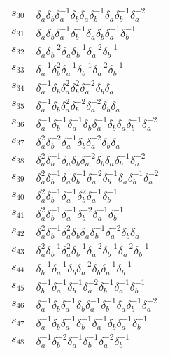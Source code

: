 \documentclass{article}
\begin{document}
\begin{center}
\begin{tabular}{ll}
$s_{30}$ & $\delta_a^{}\delta_b^{}\delta_a^{-1}\delta_b^{}\delta_a^{}\delta_b^{-1}\delta_a^{}\delta_b^{-1}\delta_a^{-2}$ \\
$s_{31}$ & $\delta_a^{}\delta_b^{}\delta_a^{-1}\delta_b^{-1}\delta_a^{}\delta_b^{}\delta_a^{-1}\delta_b^{-1}$ \\
$s_{32}$ & $\delta_a^{}\delta_b^{-2}\delta_a^{}\delta_b^{-1}\delta_a^{-2}\delta_b^{-1}$ \\
$s_{33}$ & $\delta_a^{-1}\delta_b^{2}\delta_a^{-1}\delta_b^{-1}\delta_a^{-2}\delta_b^{-1}$ \\
$s_{34}$ & $\delta_a^{-1}\delta_b^{}\delta_a^{2}\delta_b^{2}\delta_a^{-2}\delta_b^{}\delta_a^{}$ \\
$s_{35}$ & $\delta_a^{-1}\delta_b^{}\delta_a^{2}\delta_b^{-2}\delta_a^{-2}\delta_b^{}\delta_a^{}$ \\
$s_{36}$ & $\delta_a^{-1}\delta_b^{-1}\delta_a^{-1}\delta_b^{}\delta_a^{-1}\delta_b^{}\delta_a^{}\delta_b^{-1}\delta_a^{-2}$ \\
$s_{37}$ & $\delta_a^{2}\delta_b^{-2}\delta_a^{-1}\delta_b^{}\delta_a^{-2}\delta_b^{}\delta_a^{}$ \\
$s_{38}$ & $\delta_a^{2}\delta_b^{-1}\delta_a^{}\delta_b^{}\delta_a^{-2}\delta_b^{}\delta_a^{}\delta_b^{-1}\delta_a^{-2}$ \\
$s_{39}$ & $\delta_a^{2}\delta_b^{-1}\delta_a^{}\delta_b^{-1}\delta_a^{-2}\delta_b^{-1}\delta_a^{}\delta_b^{-1}\delta_a^{-2}$ \\
$s_{40}$ & $\delta_a^{2}\delta_b^{-1}\delta_a^{-1}\delta_b^{2}\delta_a^{-1}\delta_b^{-1}$ \\
$s_{41}$ & $\delta_a^{2}\delta_b^{-1}\delta_a^{-1}\delta_b^{-2}\delta_a^{-1}\delta_b^{-1}$ \\
$s_{42}$ & $\delta_a^{2}\delta_b^{-1}\delta_a^{2}\delta_b^{}\delta_a^{}\delta_b^{-1}\delta_a^{-2}\delta_b^{}\delta_a^{}$ \\
$s_{43}$ & $\delta_a^{2}\delta_b^{-1}\delta_a^{2}\delta_b^{-1}\delta_a^{-2}\delta_b^{-1}\delta_a^{-2}\delta_b^{-1}$ \\
$s_{44}$ & $\delta_b^{-1}\delta_a^{-1}\delta_b^{}\delta_a^{-2}\delta_b^{}\delta_a^{-1}\delta_b^{-1}$ \\
$s_{45}$ & $\delta_b^{-1}\delta_a^{-1}\delta_b^{-1}\delta_a^{-2}\delta_b^{-1}\delta_a^{-1}\delta_b^{-1}$ \\
$s_{46}$ & $\delta_a^{-1}\delta_b^{}\delta_a^{-1}\delta_b^{}\delta_a^{-1}\delta_b^{-1}\delta_a^{}\delta_b^{-1}\delta_a^{-2}$ \\
$s_{47}$ & $\delta_a^{-1}\delta_b^{}\delta_a^{-1}\delta_b^{-1}\delta_a^{-1}\delta_b^{}\delta_a^{-1}\delta_b^{-1}$ \\
$s_{48}$ & $\delta_a^{-1}\delta_b^{-2}\delta_a^{-1}\delta_b^{-1}\delta_a^{-2}\delta_b^{-1}$ \\
\bottomrule
\end{tabular}
\end{center}

\thispagestyle{empty}
\end{document}
